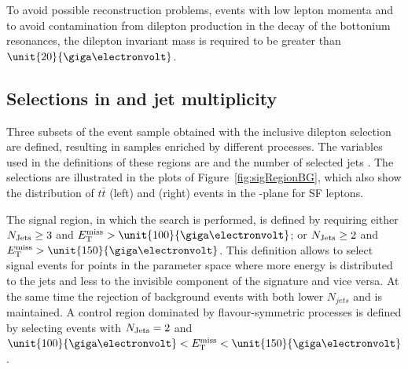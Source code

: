 To avoid possible reconstruction problems, events with low lepton momenta and to avoid contamination from dilepton production in the decay of the bottonium resonances, the dilepton invariant mass \mll is required to be greater than $\unit{20}{\giga\electronvolt}$. 


\subsection{Selections in \MET and jet multiplicity}
\label{sec:regions}
Three subsets of the event sample obtained with the inclusive dilepton selection are defined, resulting in samples enriched by different processes. The variables used in the definitions of these regions are \MET and the number of selected jets \njets. The selections are illustrated in the plots of Figure~\ref{fig:sigRegionBG}, which also show the distribution of $t\bar{t}$ (left) and \Zjets (right) events in the \MET-\njets plane for SF leptons. 
 
The signal region, in which the search is performed, is defined by requiring either $N_\text{Jets} \geq 3$ and $\MET > \unit{100}{\giga\electronvolt}$; or $N_\text{Jets} \geq 2$ and $\MET > \unit{150}{\giga\electronvolt}$. This definition allows to select signal events for points in the parameter space where more energy is distributed to the jets and less to the invisible component of the signature and vice versa. At the same time the rejection of background events with both lower $N_{jets}$ and \MET is maintained. A control region dominated by flavour-symmetric processes is defined by selecting events with $N_\text{Jets} = 2$ and $\unit{100}{\giga\electronvolt} < \MET < \unit{150}{\giga\electronvolt}$. 

